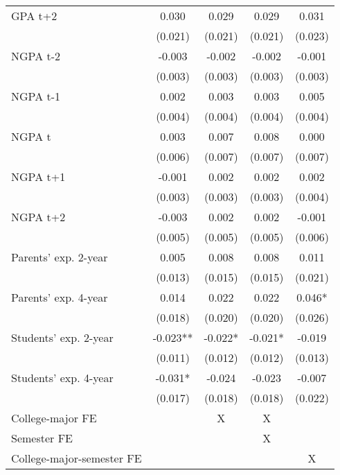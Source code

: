{{\begin{tabular}{lcccc}
GPA t+2             &       0.030   &       0.029   &       0.029   &       0.031   \\
                    &     (0.021)   &     (0.021)   &     (0.021)   &     (0.023)   \\
 
NGPA t-2            &      -0.003   &      -0.002   &      -0.002   &      -0.001   \\
                    &     (0.003)   &     (0.003)   &     (0.003)   &     (0.003)   \\
 
NGPA t-1            &       0.002   &       0.003   &       0.003   &       0.005   \\
                    &     (0.004)   &     (0.004)   &     (0.004)   &     (0.004)   \\
 
NGPA t              &       0.003   &       0.007   &       0.008   &       0.000   \\
                    &     (0.006)   &     (0.007)   &     (0.007)   &     (0.007)   \\
 
NGPA t+1            &      -0.001   &       0.002   &       0.002   &       0.002   \\
                    &     (0.003)   &     (0.003)   &     (0.003)   &     (0.004)   \\
 
NGPA t+2            &      -0.003   &       0.002   &       0.002   &      -0.001   \\
                    &     (0.005)   &     (0.005)   &     (0.005)   &     (0.006)   \\
 
Parents' exp. 2-year&       0.005   &       0.008   &       0.008   &       0.011   \\
                    &     (0.013)   &     (0.015)   &     (0.015)   &     (0.021)   \\
 
Parents' exp. 4-year&       0.014   &       0.022   &       0.022   &       0.046*  \\
                    &     (0.018)   &     (0.020)   &     (0.020)   &     (0.026)   \\
 
Students' exp. 2-year&      -0.023** &      -0.022*  &      -0.021*  &      -0.019   \\
                    &     (0.011)   &     (0.012)   &     (0.012)   &     (0.013)   \\
 
Students' exp. 4-year&      -0.031*  &      -0.024   &      -0.023   &      -0.007   \\
                    &     (0.017)   &     (0.018)   &     (0.018)   &     (0.022)   \\
 
 College-major FE                      &  & X & X &  \\
 Semester FE                           &  &   & X &  \\
 College-major-semester FE &  &   &   & X \\

\bottomrule
\end{tabular}
}
}
